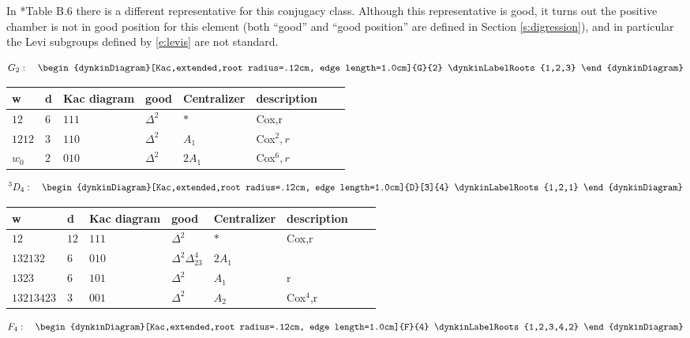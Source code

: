 \documentclass[10pt,leqno]{article}
\begin{document}
\begin{remarkplain}
In \cite{geck_pfeiffer}*{Table B.6} there is a different
representative for this conjugacy class.
Although this representative is good,
it turns out the positive chamber is not in good position for this element
(both ``good'' and ``good position'' are defined in Section \ref{s:digression}), and
in particular the Levi subgroups defined by \eqref{e:levis} are not standard.
\end{remarkplain}
\bigskip


$$
G_2:\quad \begin{dynkinDiagram}[Kac,extended,root radius=.12cm, edge length=1.0cm]{G}{2}
\dynkinLabelRoots{1,2,3}
\end{dynkinDiagram}
$$

\begin{tabular}{|l|l|l|l|l|l|l|l|}
\hline
w&   d    &  Kac diagram &good&Centralizer&description\\\hline
$12$ & $6$ &   $111$ & $\Delta^2$&$*$ & Cox,r\\\hline
$1212$ & $3$ &  $110$ & $\Delta^2$&$A_1$ &Cox$^2,r$\\\hline
$w_0$ & $2$ &  $010$ & $\Delta^2$&$2A_1$ & Cox$^6,r$\\\hline
  \end{tabular}

  \bigskip

$$
^3D_4:\quad \begin{dynkinDiagram}[Kac,extended,root radius=.12cm, edge length=1.0cm]{D}[3]{4}
\dynkinLabelRoots{1,2,1}
\end{dynkinDiagram}
$$

\begin{tabular}{|l|l|l|l|l|l|l|l|}
\hline
w&   d    &  Kac diagram &good&Centralizer&description\\\hline
  $12$ & $12$ &   $111$ & $\Delta^2$&$*$ &Cox,r\\\hline
  $132132$ & $6$ &   $010$ & $\Delta^2\Delta_{23}^4$&$2A_1$ &\\\hline
  $1323$ & $6$ &   $101$ & $\Delta^2$&$A_1$ &r\\\hline
      $13213423$ & $3$ &   $001$ & $\Delta^2$&$A_2$ &Cox$^4$,r\\\hline
  \end{tabular}

\newpage

  

$$
F_4:\quad \begin{dynkinDiagram}[Kac,extended,root radius=.12cm, edge length=1.0cm]{F}{4}
\dynkinLabelRoots{1,2,3,4,2}
\end{dynkinDiagram}
$$
\end{document}
